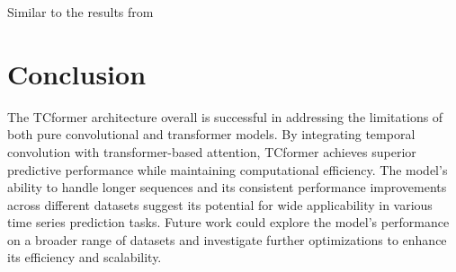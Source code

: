 \documentclass[stu,12pt,floatsintext]{apa7}
\begin{document}
Similar to the results from 



\section{Conclusion}
The TCformer architecture overall is successful in addressing the limitations of both pure convolutional and transformer models. By integrating temporal convolution with transformer-based attention, TCformer achieves superior predictive performance while maintaining computational efficiency. The model's ability to handle longer sequences and its consistent performance improvements across different datasets suggest its potential for wide applicability in various time series prediction tasks. Future work could explore the model's performance on a broader range of datasets and investigate further optimizations to enhance its efficiency and scalability.


\printbibliography
\end{document}
